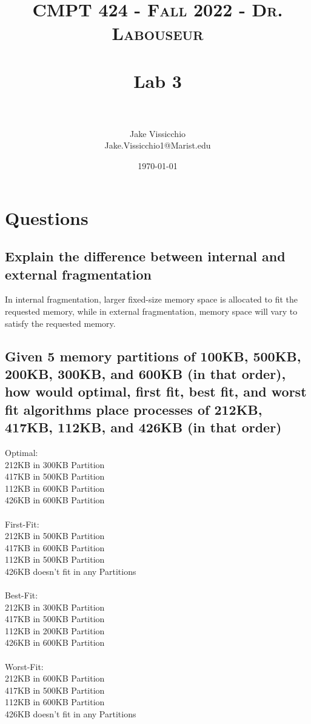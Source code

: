 \documentclass[letterpaper, 10pt]{article}
\title{	
   \normalfont\normalsize 
   \textsc{CMPT 424 - Fall 2022 - Dr. Labouseur} \\[10pt] %
   \horrule{0.5pt} \\[0.25cm] 	%
   \huge Lab 3 \\   %
   \horrule{0.5pt} \\[0.25cm] 	%
}
\author{Jake Vissicchio \\ \normalsize Jake.Vissicchio1@Marist.edu}
\date{\normalsize\today} 	%
\begin{document}
\maketitle %


\section{Questions}
\subsection{Explain the difference between internal and external fragmentation}
In internal fragmentation, larger fixed-size memory space is allocated to fit the requested memory, while in external fragmentation, memory space will vary to satisfy the requested memory.
\\
\subsection{Given 5 memory partitions of 100KB, 500KB, 200KB, 300KB, and 600KB (in that order), how would optimal, first fit, best fit, and worst fit algorithms place processes of 212KB, 417KB, 112KB, and 426KB (in that order)}
Optimal: \\
212KB in 300KB Partition \\
417KB in 500KB Partition \\ 
112KB in 600KB Partition \\
426KB in 600KB Partition \\
\\
First-Fit: \\
212KB in 500KB Partition \\
417KB in 600KB Partition \\ 
112KB in 500KB Partition \\ 
426KB doesn't fit in any Partitions \\
 \\
Best-Fit: \\
212KB in 300KB Partition \\
417KB in 500KB Partition \\ 
112KB in 200KB Partition \\
426KB in 600KB Partition \\
\\
Worst-Fit: \\
212KB in 600KB Partition \\
417KB in 500KB Partition \\
112KB in 600KB Partition \\
426KB doesn't fit in any Partitions \\
\\

\noindent
\end{document}

